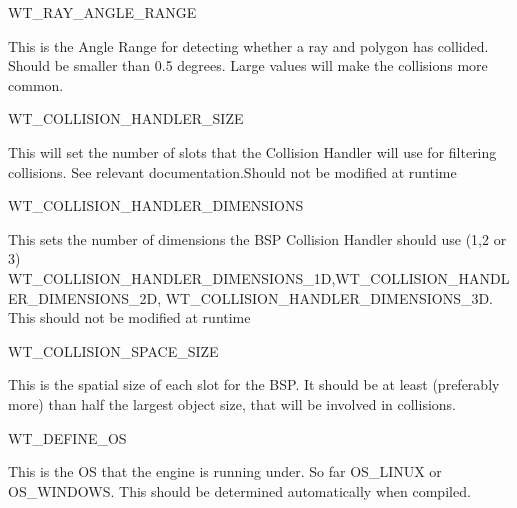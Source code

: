 \begin{DoxyItemize}
\item WT\_\-RAY\_\-ANGLE\_\-RANGE
\begin{DoxyItemize}
\item This is the Angle Range for detecting whether a ray and polygon has collided. Should be smaller than 0.5 degrees. Large values will make the collisions more common.
\end{DoxyItemize}
\end{DoxyItemize}
\begin{DoxyItemize}
\item WT\_\-COLLISION\_\-HANDLER\_\-SIZE
\begin{DoxyItemize}
\item This will set the number of slots that the Collision Handler will use for filtering collisions. See relevant documentation.Should not be modified at runtime
\end{DoxyItemize}
\end{DoxyItemize}
\begin{DoxyItemize}
\item WT\_\-COLLISION\_\-HANDLER\_\-DIMENSIONS
\begin{DoxyItemize}
\item This sets the number of dimensions the BSP Collision Handler should use (1,2 or 3) WT\_\-COLLISION\_\-HANDLER\_\-DIMENSIONS\_\-1D,WT\_\-COLLISION\_\-HANDLER\_\-DIMENSIONS\_\-2D, WT\_\-COLLISION\_\-HANDLER\_\-DIMENSIONS\_\-3D. This should not be modified at runtime
\end{DoxyItemize}
\end{DoxyItemize}
\begin{DoxyItemize}
\item WT\_\-COLLISION\_\-SPACE\_\-SIZE
\begin{DoxyItemize}
\item This is the spatial size of each slot for the BSP. It should be at least (preferably more) than half the largest object size, that will be involved in collisions.
\end{DoxyItemize}
\end{DoxyItemize}
\begin{DoxyItemize}
\item WT\_\-DEFINE\_\-OS
\begin{DoxyItemize}
\item This is the OS that the engine is running under. So far OS\_\-LINUX or OS\_\-WINDOWS. This should be determined automatically when compiled.
\end{DoxyItemize}
\end{DoxyItemize}
